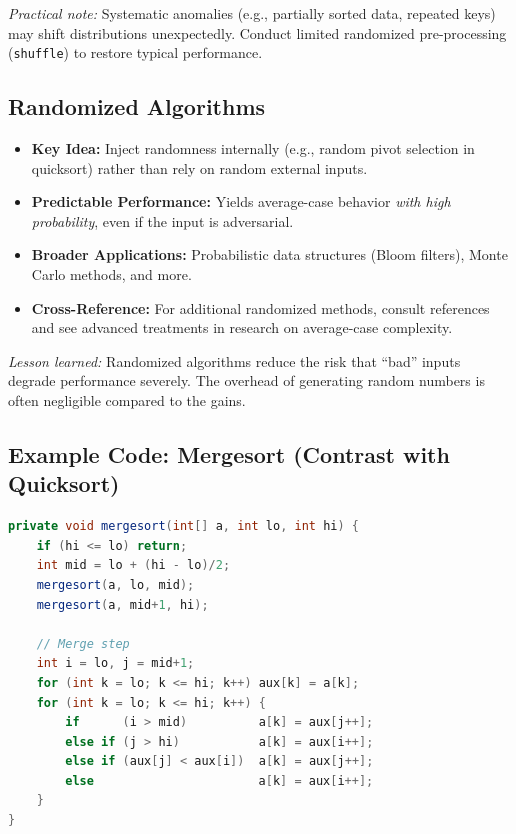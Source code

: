 \documentclass[11pt,letterpaper]{article}
\begin{document}
\noindent
\emph{Practical note:} Systematic anomalies (e.g., partially sorted data, repeated keys) may shift distributions unexpectedly. Conduct limited randomized pre-processing (\texttt{shuffle}) to restore typical performance.

\subsection{Randomized Algorithms}

\begin{itemize}
  \item \textbf{Key Idea:} Inject randomness internally (e.g., random pivot selection in quicksort) rather than rely on random external inputs.
  \item \textbf{Predictable Performance:} Yields average-case behavior \emph{with high probability}, even if the input is adversarial.
  \item \textbf{Broader Applications:} Probabilistic data structures (Bloom filters), Monte Carlo methods, and more.
  \item \textbf{Cross-Reference:} For additional randomized methods, consult references and see advanced treatments in research on average-case complexity.
\end{itemize}

\noindent
\emph{Lesson learned:} Randomized algorithms reduce the risk that “bad” inputs degrade performance severely. The overhead of generating random numbers is often negligible compared to the gains.

\subsection{Example Code: Mergesort (Contrast with Quicksort)}

\begin{lstlisting}[language=Java, label=mergesort-prog]
private void mergesort(int[] a, int lo, int hi) {
    if (hi <= lo) return;
    int mid = lo + (hi - lo)/2;
    mergesort(a, lo, mid);
    mergesort(a, mid+1, hi);

    // Merge step
    int i = lo, j = mid+1;
    for (int k = lo; k <= hi; k++) aux[k] = a[k];
    for (int k = lo; k <= hi; k++) {
        if      (i > mid)          a[k] = aux[j++];
        else if (j > hi)           a[k] = aux[i++];
        else if (aux[j] < aux[i])  a[k] = aux[j++];
        else                       a[k] = aux[i++];
    }
}
\end{lstlisting}
\end{document}
